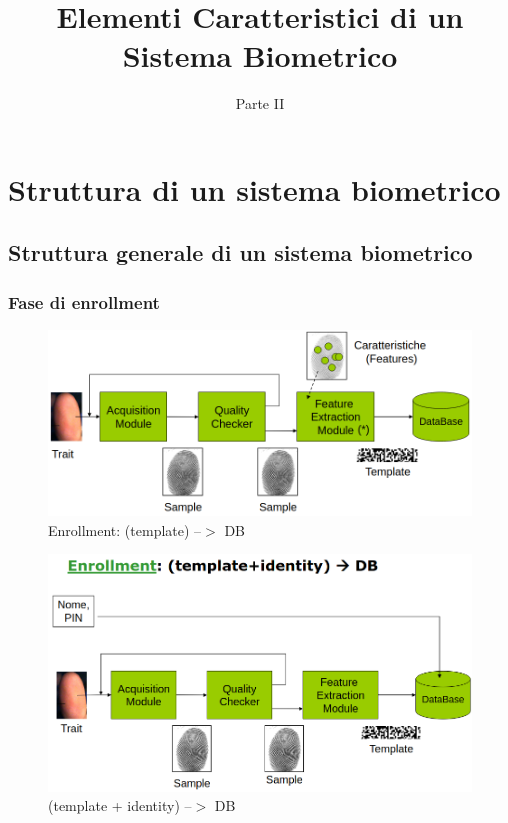 \documentclass{report}
\title{Elementi Caratteristici di un Sistema Biometrico}
\date{Parte II}
\begin{document}
\maketitle

\tableofcontents
\newpage


\chapter{Struttura di un sistema biometrico}


\section{Struttura generale di un sistema biometrico}

\subsection{Fase di enrollment}

\begin{figure}[ht]
    \centering
    \includegraphics[width=0.95\linewidth]{images/enrollment-gen.png}
    \caption{Enrollment: (template) --$>$ DB}
    \label{fig:enroll-gen}
\end{figure}

\begin{figure}[ht]
    \centering
    \includegraphics[width=0.95\linewidth]{images/enrollment-gen-id.png}
    \caption{(template + identity) --$>$ DB}
    \label{fig:enroll-gen-id}
\end{figure}
\end{document}
